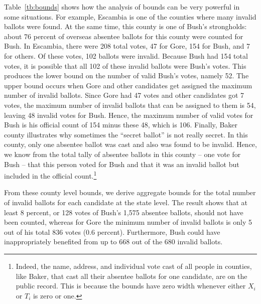 \documentclass[11pt,titlepage]{article}
\begin{document}
\vspace{-0.25in}
Table~\ref{tb:bounds} shows how the analysis of bounds can be very
powerful in some situations. For example, Escambia is one of the
counties where many invalid ballots were found. At the same time, this
county is one of Bush's strongholds: about 76 percent of overseas
absentee ballots for this county were counted for Bush. In Escambia,
there were 208 total votes, 47 for Gore, 154 for Bush, and 7 for
others. Of these votes, 102 ballots were invalid. Because Bush had 154
total votes, it is possible that all 102 of these invalid ballots were
Bush's votes. This produces the lower bound on the number of valid
Bush's votes, namely 52.  The upper bound occurs when Gore and other
candidates get assigned the maximum number of invalid ballots. Since
Gore had 47 votes and other candidates got 7 votes, the maximum number
of invalid ballots that can be assigned to them is 54, leaving 48
invalid votes for Bush. Hence, the maximum number of valid votes for
Bush is his official count of 154 minus these 48, which is 106.
Finally, Baker county illustrates why sometimes the ``secret ballot''
is not really secret.  In this county, only one absentee ballot was
cast and also was found to be invalid. Hence, we know from the total
tally of absentee ballots in this county -- one vote for Bush -- that
this person voted for Bush and that it was an invalid ballot but
included in the official count.\footnote{Indeed, the name, address,
  and individual vote cast of all people in counties, like Baker, that
  cast all their absentee ballots for one candidate, are on the public
  record.  This is because the bounds have zero width whenever either
  $X_i$ or $T_i$ is zero or one.}

From these county level bounds, we derive aggregate bounds for the
total number of invalid ballots for each candidate at the state level.
The result shows that at least 8 percent, or 128 votes of Bush's 1,575
absentee ballots, should not have been counted, whereas for Gore the
minimum number of invalid ballots is only 5 out of his total 836 votes
(0.6 percent).  Furthermore, Bush could have inappropriately benefited
from up to 668 out of the 680 invalid ballots.
\end{document}
